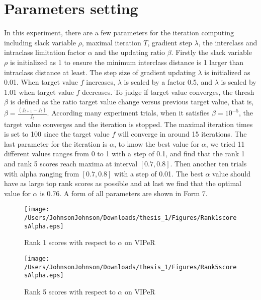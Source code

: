 \section{Parameters setting}
In this experiment, there are a few parameters for the iteration computing including slack variable $\rho$, maximal iteration $T$, gradient step $\lambda$, the interclass and intraclass limitation factor $\alpha$ and the updating ratio $\beta$. Firstly the slack variable $\rho$ is initialized as 1 to ensure the minimum interclass distance is 1 larger than intraclass distance at least. The step size of gradient updating $\lambda$ is initialized as 0.01. When target value $f$ increases,  $\lambda$ is scaled by a factor 0.5, and  $\lambda$ is scaled by 1.01 when target value $f$ decreases. To judge if target value converges, the thresh $\beta$ is defined as the ratio target value change versus previous target value, that is, $\beta = \frac{(f_{t+1}-f_t)}{f_t}$. According many experiment trials, when it satisfies $\beta = 10^{-5}$, the target value converges and the iteration is stopped. The maximal iteration times is set to 100 since the target value $f$ will converge in around 15 iterations.  The last parameter for the iteration is $\alpha$, to know the best value for $\alpha$, we tried 11 different values ranges from 0 to 1 with a step of 0.1, and find that the rank 1 and rank 5 scores reach maxima at interval $[0.7,0.8]$. Then another ten trials with alpha ranging from $[0.7,0.8]$ with a step of 0.01. The best $\alpha$ value should have as large top rank scores as possible and at last we find that the optimal value for $\alpha$ is 0.76. A form of all parameters are shown in Form 7.
\begin{figure}[H]
\begin{raggedleft}
\texttt{[image: /Users/JohnsonJohnson/Downloads/thesis\_1/Figures/Rank1scoresAlpha.eps]}
\vspace{-3em}
\caption{Rank 1 scores with respect to $\alpha$ on VIPeR}
\end{raggedleft}
\end{figure}
\begin{figure}[H]
\begin{raggedleft}
\texttt{[image: /Users/JohnsonJohnson/Downloads/thesis\_1/Figures/Rank5scoresAlpha.eps]}
\vspace{-3em}
\caption{Rank 5 scores with respect to $\alpha$ on VIPeR}
\end{raggedleft}
\end{figure}


